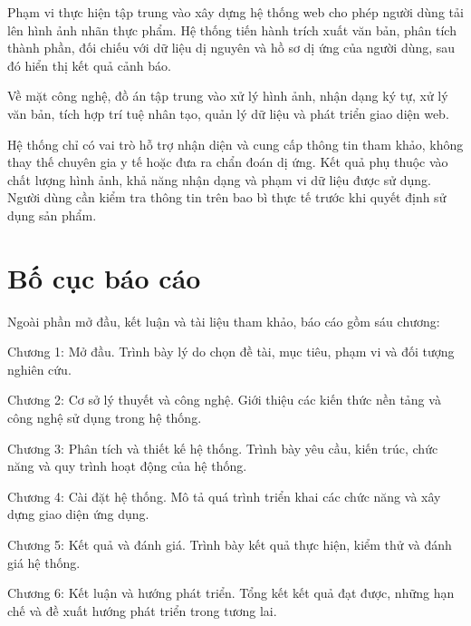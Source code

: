 Phạm vi thực hiện tập trung vào xây dựng hệ thống web cho phép người dùng tải lên hình ảnh nhãn thực phẩm. Hệ thống tiến hành trích xuất văn bản, phân tích thành phần, đối chiếu với dữ liệu dị nguyên và hồ sơ dị ứng của người dùng, sau đó hiển thị kết quả cảnh báo.

Về mặt công nghệ, đồ án tập trung vào xử lý hình ảnh, nhận dạng ký tự, xử lý văn bản, tích hợp trí tuệ nhân tạo, quản lý dữ liệu và phát triển giao diện web.

Hệ thống chỉ có vai trò hỗ trợ nhận diện và cung cấp thông tin tham khảo, không thay thế chuyên gia y tế hoặc đưa ra chẩn đoán dị ứng. Kết quả phụ thuộc vào chất lượng hình ảnh, khả năng nhận dạng và phạm vi dữ liệu được sử dụng. Người dùng cần kiểm tra thông tin trên bao bì thực tế trước khi quyết định sử dụng sản phẩm.


\section{Bố cục báo cáo}

Ngoài phần mở đầu, kết luận và tài liệu tham khảo, báo cáo gồm sáu chương:

Chương 1: Mở đầu. Trình bày lý do chọn đề tài, mục tiêu, phạm vi và đối tượng nghiên cứu.

Chương 2: Cơ sở lý thuyết và công nghệ. Giới thiệu các kiến thức nền tảng và công nghệ sử dụng trong hệ thống.

Chương 3: Phân tích và thiết kế hệ thống. Trình bày yêu cầu, kiến trúc, chức năng và quy trình hoạt động của hệ thống.

Chương 4: Cài đặt hệ thống. Mô tả quá trình triển khai các chức năng và xây dựng giao diện ứng dụng.

Chương 5: Kết quả và đánh giá. Trình bày kết quả thực hiện, kiểm thử và đánh giá hệ thống.

Chương 6: Kết luận và hướng phát triển. Tổng kết kết quả đạt được, những hạn chế và đề xuất hướng phát triển trong tương lai.
